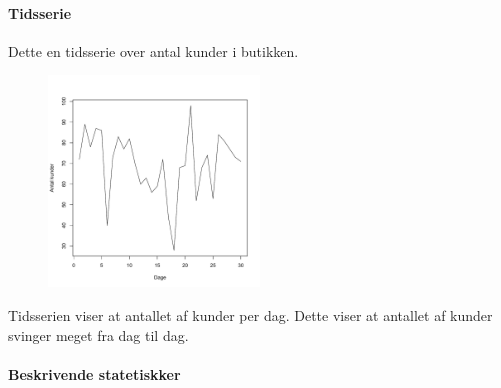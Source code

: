 \documentclass{article}
\begin{document}
\paragraph{Tidsserie} Dette en tidsserie over antal kunder i butikken.

\begin{figure}[H] 
  \centering
  \includegraphics[width=0.5\textwidth]{../velser/uge37/R/opg2.pdf}
\end{figure}
Tidsserien viser at antallet af kunder per dag. Dette viser at antallet af
kunder svinger meget fra dag til dag.

\paragraph{Beskrivende statetiskker}
\end{document}
